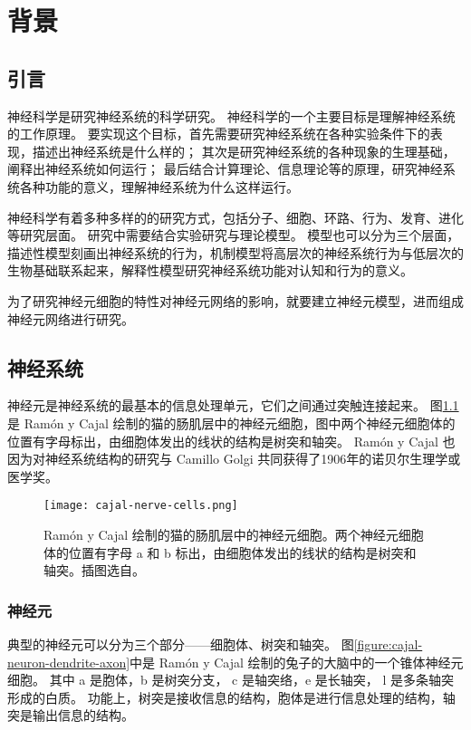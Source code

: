\chapter{背景}
\label{chapter:background}

\section{引言}
\label{section:background:introduction}
神经科学是研究神经系统的科学研究。
神经科学的一个主要目标是理解神经系统的工作原理。
要实现这个目标，首先需要研究神经系统在各种实验条件下的表现，描述出神经系统是什么样的；
其次是研究神经系统的各种现象的生理基础，阐释出神经系统如何运行；
最后结合计算理论、信息理论等的原理，研究神经系统各种功能的意义，理解神经系统为什么这样运行。

神经科学有着多种多样的的研究方式，包括分子、细胞、环路、行为、发育、进化等研究层面。
研究中需要结合实验研究与理论模型。
模型也可以分为三个层面，描述性模型刻画出神经系统的行为，机制模型将高层次的神经系统行为与低层次的生物基础联系起来，解释性模型研究神经系统功能对认知和行为的意义\cite{Dayan2001}。

为了研究神经元细胞的特性对神经元网络的影响，就要建立神经元模型，进而组成神经元网络进行研究。

\section{神经系统}
\label{section:background:neuron-model}
神经元是神经系统的最基本的信息处理单元，它们之间通过突触连接起来。
图\ref{figure:cajal-nerve-cells}是 Ramón y Cajal 绘制的猫的肠肌层中的神经元细胞\cite{Cajal1909}，图中两个神经元细胞体的位置有字母标出，由细胞体发出的线状的结构是树突和轴突。
Ramón y Cajal 也因为对神经系统结构的研究与 Camillo Golgi 共同获得了1906年的诺贝尔生理学或医学奖。

\begin{figure}
  \centering
  \texttt{[image: cajal-nerve-cells.png]}
  \caption{Ramón y Cajal 绘制的猫的肠肌层中的神经元细胞。两个神经元细胞体的位置有字母 a 和 b 标出，由细胞体发出的线状的结构是树突和轴突。插图选自\protect{}。}
  \label{figure:cajal-nerve-cells}
\end{figure}

\subsection{神经元}
\label{section:background:neuron}
典型的神经元可以分为三个部分——细胞体、树突和轴突\cite{Gerstner2002}。
图\ref{figure:cajal-neuron-dendrite-axon}中是 Ramón y Cajal 绘制的兔子的大脑中的一个锥体神经元细胞\cite{Cajal1909}。
其中 a 是胞体，b 是树突分支， c 是轴突络，e 是长轴突， l 是多条轴突形成的白质。
功能上，树突是接收信息的结构，胞体是进行信息处理的结构，轴突是输出信息的结构。

